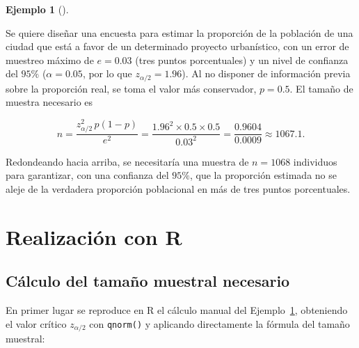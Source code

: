\documentclass[
  spanish,
  a4paper,
]{scrreport}
\theoremstyle{definition}
\newtheorem{example}{Ejemplo}[chapter]
\theoremstyle{definition}
\theoremstyle{remark}
\begin{document}
\begin{example}[]\protect\hypertarget{exm-encuestas-tamano-muestral}{}\label{exm-encuestas-tamano-muestral}

Se quiere diseñar una encuesta para estimar la proporción de la
población de una ciudad que está a favor de un determinado proyecto
urbanístico, con un error de muestreo máximo de \(e=0.03\) (tres puntos
porcentuales) y un nivel de confianza del \(95\%\) (\(\alpha=0.05\), por
lo que \(z_{\alpha/2}=1.96\)). Al no disponer de información previa
sobre la proporción real, se toma el valor más conservador, \(p=0.5\).
El tamaño de muestra necesario es

\[n = \frac{z_{\alpha/2}^2\, p(1-p)}{e^2} = \frac{1.96^2 \times 0.5 \times 0.5}{0.03^2} = \frac{0.9604}{0.0009} \approx 1067.1.\]

Redondeando hacia arriba, se necesitaría una muestra de \(n=1068\)
individuos para garantizar, con una confianza del \(95\%\), que la
proporción estimada no se aleje de la verdadera proporción poblacional
en más de tres puntos porcentuales.

\end{example}

\section{Realización con R}\label{realizaciuxf3n-con-r-7}

\subsection{Cálculo del tamaño muestral
necesario}\label{cuxe1lculo-del-tamauxf1o-muestral-necesario}

En primer lugar se reproduce en R el cálculo manual del
Ejemplo~\ref{exm-encuestas-tamano-muestral}, obteniendo el valor crítico
\(z_{\alpha/2}\) con \texttt{qnorm()} y aplicando directamente la
fórmula del tamaño muestral:
\end{document}
